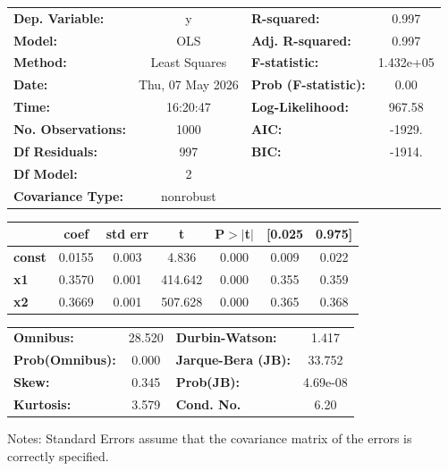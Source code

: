 \begin{center}
\begin{tabular}{lclc}
\toprule
\textbf{Dep. Variable:}    &        y         & \textbf{  R-squared:         } &     0.997   \\
\textbf{Model:}            &       OLS        & \textbf{  Adj. R-squared:    } &     0.997   \\
\textbf{Method:}           &  Least Squares   & \textbf{  F-statistic:       } & 1.432e+05   \\
\textbf{Date:}             & Thu, 07 May 2026 & \textbf{  Prob (F-statistic):} &     0.00    \\
\textbf{Time:}             &     16:20:47     & \textbf{  Log-Likelihood:    } &    967.58   \\
\textbf{No. Observations:} &        1000      & \textbf{  AIC:               } &    -1929.   \\
\textbf{Df Residuals:}     &         997      & \textbf{  BIC:               } &    -1914.   \\
\textbf{Df Model:}         &           2      & \textbf{                     } &             \\
\textbf{Covariance Type:}  &    nonrobust     & \textbf{                     } &             \\
\bottomrule
\end{tabular}
\begin{tabular}{lcccccc}
               & \textbf{coef} & \textbf{std err} & \textbf{t} & \textbf{P$> |$t$|$} & \textbf{[0.025} & \textbf{0.975]}  \\
\midrule
\textbf{const} &       0.0155  &        0.003     &     4.836  &         0.000        &        0.009    &        0.022     \\
\textbf{x1}    &       0.3570  &        0.001     &   414.642  &         0.000        &        0.355    &        0.359     \\
\textbf{x2}    &       0.3669  &        0.001     &   507.628  &         0.000        &        0.365    &        0.368     \\
\bottomrule
\end{tabular}
\begin{tabular}{lclc}
\textbf{Omnibus:}       & 28.520 & \textbf{  Durbin-Watson:     } &    1.417  \\
\textbf{Prob(Omnibus):} &  0.000 & \textbf{  Jarque-Bera (JB):  } &   33.752  \\
\textbf{Skew:}          &  0.345 & \textbf{  Prob(JB):          } & 4.69e-08  \\
\textbf{Kurtosis:}      &  3.579 & \textbf{  Cond. No.          } &     6.20  \\
\bottomrule
\end{tabular}
\end{center}

Notes: \newline
 [1] Standard Errors assume that the covariance matrix of the errors is correctly specified.